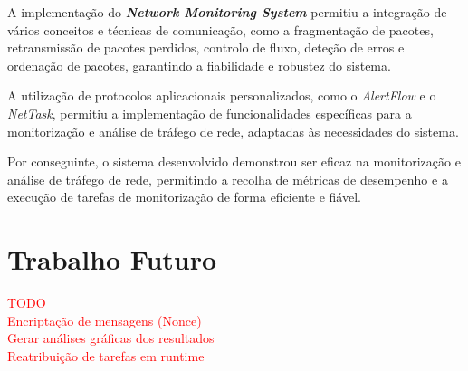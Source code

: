 \documentclass[a4paper,12pt]{scrreprt}
\begin{document}
A implementação do \textbf{\textit{Network Monitoring System}} permitiu a integração de
vários conceitos e técnicas de comunicação, como a fragmentação de pacotes, retransmissão
de pacotes perdidos, controlo de fluxo, deteção de erros e ordenação de pacotes, garantindo
a fiabilidade e robustez do sistema.

A utilização de protocolos aplicacionais personalizados, como o \textit{AlertFlow} e o
\textit{NetTask}, permitiu a implementação de funcionalidades específicas para a
monitorização e análise de tráfego de rede, adaptadas às necessidades do sistema.


Por conseguinte, o sistema desenvolvido demonstrou ser eficaz na monitorização e
análise de tráfego de rede, permitindo a recolha de métricas de
desempenho e a execução de tarefas de monitorização de forma eficiente e fiável.

\section{Trabalho Futuro}

\textcolor{red}{
    TODO \\
    Encriptação de mensagens (Nonce) \\
    Gerar análises gráficas dos resultados \\
    Reatribuição de tarefas em runtime
}



%
%
%
%
%
\end{document}

